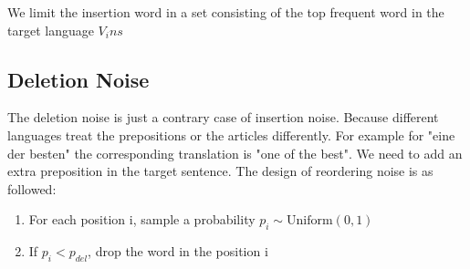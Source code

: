 	We limit the insertion word in a set consisting of the top frequent word in the target language ${V_ins}$

	\subsection{Deletion Noise}
	The deletion noise is just a contrary case of insertion noise. Because different languages treat the prepositions or the articles differently. For example for "eine der besten" the corresponding translation is "one of the best". We need to add an extra preposition in the target sentence.  The design of reordering noise is as followed:
	
	\begin{enumerate}
		\item For each position i, sample a probability ${p_i \sim \textrm{Uniform}(0,1)}$
		\item If ${p_i} < p_{del}$, drop the word in the position i
	\end{enumerate}
	
	
	
	
	
	
	
	
	
	
	
	
	
	
	
	
	